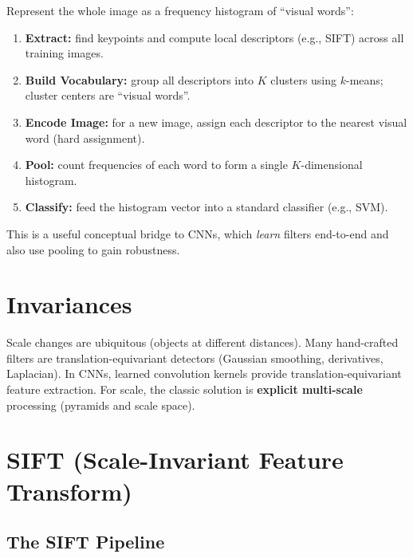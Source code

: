 \documentclass[11pt, oneside]{book}
\begin{document}
\begin{thmbox}[title={Reprojection Error Minimization}]
\begin{defbox}[title={Correlation and Convolution}]
\begin{defbox}[title={ReLU and Pooling}]
\begin{thmbox}[title={BoVW Pipeline}]
Represent the whole image as a frequency histogram of ``visual words'':
\begin{enumerate}
  \item \textbf{Extract:} find keypoints and compute local descriptors (e.g., SIFT) across all training images.
  \item \textbf{Build Vocabulary:} group all descriptors into $K$ clusters using $k$-means; cluster centers are ``visual words''.
  \item \textbf{Encode Image:} for a new image, assign each descriptor to the nearest visual word (hard assignment).
  \item \textbf{Pool:} count frequencies of each word to form a single $K$-dimensional histogram.
  \item \textbf{Classify:} feed the histogram vector into a standard classifier (e.g., SVM).
\end{enumerate}
\end{thmbox}

This is a useful conceptual bridge to CNNs, which \emph{learn} filters end-to-end and also use pooling to gain robustness.

\section{Invariances}

Scale changes are ubiquitous (objects at different distances). Many hand-crafted filters are translation-equivariant
detectors (Gaussian smoothing, derivatives, Laplacian). In CNNs, learned convolution kernels provide
translation-equivariant feature extraction. For scale, the classic solution is \textbf{explicit multi-scale}
processing (pyramids and scale space).

\section{SIFT (Scale-Invariant Feature Transform)}

\subsection{The SIFT Pipeline}


\end{defbox}
\end{defbox}
\end{thmbox}
\end{document}
